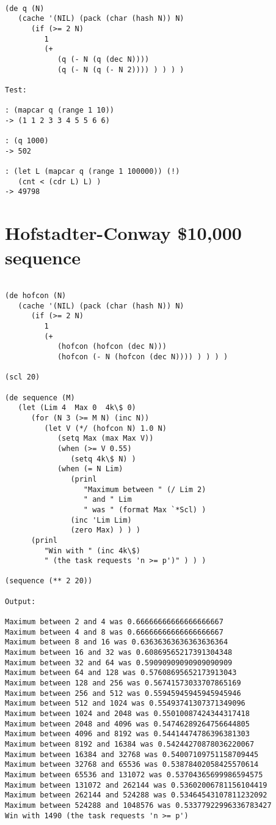\begin{verbatim}

(de q (N)
   (cache '(NIL) (pack (char (hash N)) N)
      (if (>= 2 N)
         1
         (+
            (q (- N (q (dec N))))
            (q (- N (q (- N 2)))) ) ) ) )

Test:

: (mapcar q (range 1 10))
-> (1 1 2 3 3 4 5 5 6 6)

: (q 1000)
-> 502

: (let L (mapcar q (range 1 100000)) (!)
   (cnt < (cdr L) L) )
-> 49798

\end{verbatim}

\section*{Hofstadter-Conway \$10,000 sequence}

\begin{verbatim}

(de hofcon (N)
   (cache '(NIL) (pack (char (hash N)) N)
      (if (>= 2 N)
         1
         (+
            (hofcon (hofcon (dec N)))
            (hofcon (- N (hofcon (dec N)))) ) ) ) )

(scl 20)

(de sequence (M)
   (let (Lim 4  Max 0  4k\$ 0)
      (for (N 3 (>= M N) (inc N))
         (let V (*/ (hofcon N) 1.0 N)
            (setq Max (max Max V))
            (when (>= V 0.55)
               (setq 4k\$ N) )
            (when (= N Lim)
               (prinl
                  "Maximum between " (/ Lim 2)
                  " and " Lim
                  " was " (format Max `*Scl) )
               (inc 'Lim Lim)
               (zero Max) ) ) )
      (prinl
         "Win with " (inc 4k\$)
         " (the task requests 'n >= p')" ) ) )

(sequence (** 2 20))

Output:

Maximum between 2 and 4 was 0.66666666666666666667
Maximum between 4 and 8 was 0.66666666666666666667
Maximum between 8 and 16 was 0.63636363636363636364
Maximum between 16 and 32 was 0.60869565217391304348
Maximum between 32 and 64 was 0.59090909090909090909
Maximum between 64 and 128 was 0.57608695652173913043
Maximum between 128 and 256 was 0.56741573033707865169
Maximum between 256 and 512 was 0.55945945945945945946
Maximum between 512 and 1024 was 0.55493741307371349096
Maximum between 1024 and 2048 was 0.55010087424344317418
Maximum between 2048 and 4096 was 0.54746289264756644805
Maximum between 4096 and 8192 was 0.54414474786396381303
Maximum between 8192 and 16384 was 0.54244270878036220067
Maximum between 16384 and 32768 was 0.54007109751158709445
Maximum between 32768 and 65536 was 0.53878402058425570614
Maximum between 65536 and 131072 was 0.53704365699986594575
Maximum between 131072 and 262144 was 0.53602006781156104419
Maximum between 262144 and 524288 was 0.53464543107811232092
Maximum between 524288 and 1048576 was 0.53377922996336783427
Win with 1490 (the task requests 'n >= p')

\end{verbatim}


